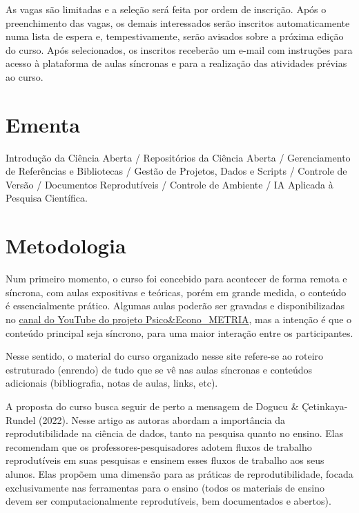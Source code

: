 \documentclass[
  a4paper,
]{book}
\begin{document}
As vagas são limitadas e a seleção será feita por ordem de inscrição.
Após o preenchimento das vagas, os demais interessados serão inscritos
automaticamente numa lista de espera e, tempestivamente, serão avisados
sobre a próxima edição do curso. Após selecionados, os inscritos
receberão um e-mail com instruções para acesso à plataforma de aulas
síncronas e para a realização das atividades prévias ao curso.

\section*{Ementa}\label{sec-ementa}


Introdução da Ciência Aberta / Repositórios da Ciência Aberta /
Gerenciamento de Referências e Bibliotecas / Gestão de Projetos, Dados e
Scripts / Controle de Versão / Documentos Reprodutíveis / Controle de
Ambiente / IA Aplicada à Pesquisa Científica.

\section*{Metodologia}\label{sec-method}


Num primeiro momento, o curso foi concebido para acontecer de forma
remota e síncrona, com aulas expositivas e teóricas, porém em grande
medida, o conteúdo é essencialmente prático. Algumas aulas poderão ser
gravadas e disponibilizadas no
\href{https://www.youtube.com/c/PsicoEconoMETRIA}{canal do YouTube do
projeto Psico\&Econo\_METRIA}, mas a intenção é que o conteúdo principal
seja síncrono, para uma maior interação entre os participantes.

Nesse sentido, o material do curso organizado nesse site refere-se ao
roteiro estruturado (enrendo) de tudo que se vê nas aulas síncronas e
conteúdos adicionais (bibliografia, notas de aulas, links, etc).

A proposta do curso busca seguir de perto a mensagem de Dogucu \&
Çetinkaya-Rundel (2022). Nesse artigo as autoras abordam a importância
da reprodutibilidade na ciência de dados, tanto na pesquisa quanto no
ensino. Elas recomendam que os professores-pesquisadores adotem fluxos
de trabalho reprodutíveis em suas pesquisas e ensinem esses fluxos de
trabalho aos seus alunos. Elas propõem uma dimensão para as práticas de
reprodutibilidade, focada exclusivamente nas ferramentas para o ensino
(todos os materiais de ensino devem ser computacionalmente
reprodutíveis, bem documentados e abertos).
\end{document}

